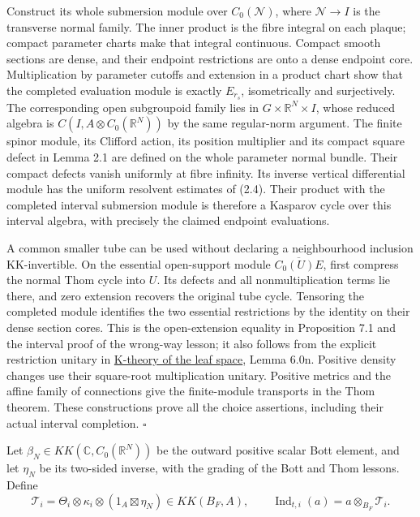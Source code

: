 \documentclass[
  11pt,
]{article}
\begin{document}
Construct its whole submersion module over \(C_0(\mathcal N)\), where
\(\mathcal N\to I\) is the transverse normal family. The inner product
is the fibre integral on each plaque; compact parameter charts make that
integral continuous. Compact smooth sections are dense, and their
endpoint restrictions are onto a dense endpoint core. Multiplication by
parameter cutoffs and extension in a product chart show that the
completed evaluation module is exactly \(E_{r_s}\), isometrically and
surjectively. The corresponding open subgroupoid family lies in
\(G\times\mathbb R^N\times I\), whose reduced algebra is
\(C(I,A\otimes C_0(\mathbb R^N))\) by the same regular-norm argument.
The finite spinor module, its Clifford action, its position multiplier
and its compact square defect in Lemma 2.1 are defined on the whole
parameter normal bundle. Their compact defects vanish uniformly at fibre
infinity. Its inverse vertical differential module has the uniform
resolvent estimates of (2.4). Their product with the completed interval
submersion module is therefore a Kasparov cycle over this interval
algebra, with precisely the claimed endpoint evaluations.

A common smaller tube can be used without declaring a neighbourhood
inclusion KK-invertible. On the essential open-support module
\(\overline{C_0(U)E}\), first compress the normal Thom cycle into \(U\).
Its defects and all nonmultiplication terms lie there, and zero
extension recovers the original tube cycle. Tensoring the completed
module identifies the two essential restrictions by the identity on
their dense section cores. This is the open-extension equality in
Proposition 7.1 and the interval proof of the wrong-way lesson; it also
follows from the explicit restriction unitary in
\href{../NCG-FOLIATIONS/k-theory-of-the-leaf-space.html\#section-6}{K-theory
of the leaf space}, Lemma 6.0n. Positive density changes use their
square-root multiplication unitary. Positive metrics and the affine
family of connections give the finite-module transports in the Thom
theorem. These constructions prove all the choice assertions, including
their actual interval completion. \(\square\)

Let \(\beta_N\in KK(\mathbb C,C_0(\mathbb R^N))\) be the outward
positive scalar Bott element, and let \(\eta_N\) be its two-sided
inverse, with the grading of the Bott and Thom lessons. Define \[
 \mathcal T_i=\Theta_i\otimes\kappa_i\otimes(1_A\boxtimes\eta_N)
 \in KK(B_F,A),\qquad
 \operatorname{Ind}_{t,i}(a)=a\otimes_{B_F}\mathcal T_i.
 \tag{2.7}
\]
\end{document}
